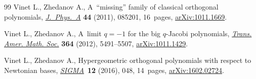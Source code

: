 \documentclass[pdftex]{sigma}
\numberwithin{equation}{section}
\begin{document}
\begin{thebibliography}{99}
Vinet L., Zhedanov A., A~``missing'' family of classical orthogonal
 polynomials,
 \href{https://doi.org/10.1088/1751-8113/44/8/085201}{\textit{J.~Phys.~A}}
 \textbf{44} (2011), 085201, 16~pages,
 \href{http://arxiv.org/abs/1011.1669}{arXiv:1011.1669}.

Vinet L., Zhedanov A., A~limit {$q=-1$} for the big {$q$}-{J}acobi polynomials,
 \href{https://doi.org/10.1090/S0002-9947-2012-05539-5}{\textit{Trans. Amer.
 Math. Soc.}} \textbf{364} (2012), 5491--5507,
 \href{http://arxiv.org/abs/1011.1429}{arXiv:1011.1429}.

Vinet L., Zhedanov A., Hypergeometric orthogonal polynomials with respect to
 {N}ewtonian bases,
 \href{https://doi.org/10.3842/SIGMA.2016.048}{\textit{SIGMA}}~\textbf{12}
 (2016), 048, 14~pages,
 \href{http://arxiv.org/abs/1602.02724}{arXiv:1602.02724}.

\end{thebibliography}\LastPageEnding
\end{document}
